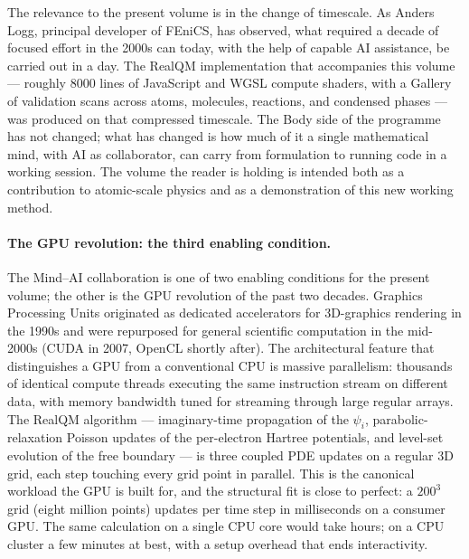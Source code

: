 The relevance to the present volume is in the change of timescale. As Anders Logg, principal developer of FEniCS, has observed, what required a decade of focused effort in the 2000s can today, with the help of capable AI assistance, be carried out in a day. The RealQM implementation that accompanies this volume --- roughly 8000 lines of JavaScript and WGSL compute shaders, with a Gallery of validation scans across atoms, molecules, reactions, and condensed phases --- was produced on that compressed timescale. The Body side of the programme has not changed; what has changed is how much of it a single mathematical mind, with AI as collaborator, can carry from formulation to running code in a working session. The volume the reader is holding is intended both as a contribution to atomic-scale physics and as a demonstration of this new working method.

\paragraph{The GPU revolution: the third enabling condition.}
The Mind--AI collaboration is one of two enabling conditions for the present volume; the other is the GPU revolution of the past two decades. Graphics Processing Units originated as dedicated accelerators for 3D-graphics rendering in the 1990s and were repurposed for general scientific computation in the mid-2000s (CUDA in 2007, OpenCL shortly after). The architectural feature that distinguishes a GPU from a conventional CPU is massive parallelism: thousands of identical compute threads executing the same instruction stream on different data, with memory bandwidth tuned for streaming through large regular arrays. The RealQM algorithm --- imaginary-time propagation of the $\psi_i$, parabolic-relaxation Poisson updates of the per-electron Hartree potentials, and level-set evolution of the free boundary --- is three coupled PDE updates on a regular 3D grid, each step touching every grid point in parallel. This is the canonical workload the GPU is built for, and the structural fit is close to perfect: a $200^3$ grid (eight million points) updates per time step in milliseconds on a consumer GPU. The same calculation on a single CPU core would take hours; on a CPU cluster a few minutes at best, with a setup overhead that ends interactivity.

